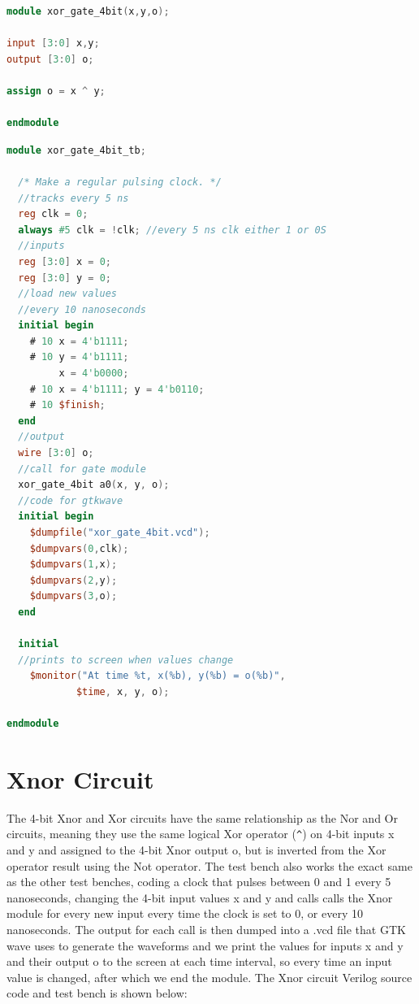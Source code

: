 \documentclass[runningheads, 12pt]{report}
\begin{document}
\begin{lstlisting}[language=Verilog, caption={Xor Circuit Verilog}]
module xor_gate_4bit(x,y,o);

input [3:0] x,y;
output [3:0] o;

assign o = x ^ y;

endmodule
\end{lstlisting}


\begin{lstlisting}[language=Verilog, caption={Xor Circuit Test Bench}]
module xor_gate_4bit_tb;

  /* Make a regular pulsing clock. */	
  //tracks every 5 ns
  reg clk = 0;
  always #5 clk = !clk; //every 5 ns clk either 1 or 0S
  //inputs
  reg [3:0] x = 0;	 
  reg [3:0] y = 0;
  //load new values
  //every 10 nanoseconds
  initial begin	
    # 10 x = 4'b1111;
    # 10 y = 4'b1111;
    	 x = 4'b0000;
    # 10 x = 4'b1111; y = 4'b0110;
    # 10 $finish;
  end
  //output
  wire [3:0] o;	
  //call for gate module
  xor_gate_4bit a0(x, y, o); 
  //code for gtkwave
  initial begin	
    $dumpfile("xor_gate_4bit.vcd");
    $dumpvars(0,clk);
    $dumpvars(1,x);
    $dumpvars(2,y);
    $dumpvars(3,o);
  end
  
  initial 	
  //prints to screen when values change
    $monitor("At time %t, x(%b), y(%b) = o(%b)",  
    		$time, x, y, o);   
    									
endmodule 
\end{lstlisting}
	
	\section{Xnor Circuit}

	The 4-bit Xnor and Xor circuits have the same relationship as the Nor and Or circuits, meaning they use the same logical Xor operator (\verb|^|) on 4-bit inputs x and y and assigned to the 4-bit Xnor output o, but is inverted from the Xor operator result using the Not operator. The test bench also works the exact same as the other test benches, coding a clock that pulses between 0 and 1 every 5 nanoseconds, changing the 4-bit input values x and y and calls calls the Xnor module for every new input every time the clock is set to 0, or every 10 nanoseconds. The output for each call is then dumped into a .vcd file that GTK wave uses to generate the waveforms and we print the values for inputs x and y and their output o to the screen at each time interval, so every time an input value is changed, after which we end the module. The Xnor circuit Verilog source code and test bench is shown below:
	
\end{document}
